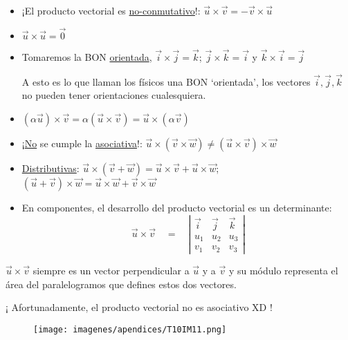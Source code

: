 \begin{itemize}
	\item ¡El producto vectorial es \underline{no-conmutativo}!: $\vec u \times \vec v=-\vec v \times \vec u$
	\item $\vec u \times \vec u=\vec 0$
	\item Tomaremos la BON \underline{orientada}, $\vec i \times \vec j = \vec k$; $\vec j \times \vec k = \vec i$ y $\vec k \times \vec i = \vec j$

A esto es lo que llaman los físicos una BON `orientada', los vectores $\vec i, \vec j, \vec k$ no pueden tener orientaciones cualesquiera. 	

\item $(\alpha \vec u)\times \vec v=\alpha (\vec u \times \vec v)= \vec u \times (\alpha \vec v)$
\item ¡\underline{No} se cumple la \underline{asociativa}!: $\vec u \times (\vec v \times \vec w) \neq (\vec u \times \vec v)\times \vec w$
\item \underline{Distributivas}: $\vec u \times (\vec v + \vec w)= \vec u \times \vec v + \vec u \times \vec w$; $(\vec u + \vec v)\times \vec w=\vec u \times \vec w + \vec v \times \vec w$
\item En componentes, el desarrollo del producto vectorial es un determinante:
\begin{equation}		
\boxed{ \ \overrightarrow { u } \times \overrightarrow { v } \quad =\quad \left| \begin{matrix} \overrightarrow { i }  & \overrightarrow { j }  & \overrightarrow { k }  \\ u_1 & u_2 & u_3 \\ v_1 & v_2 & v_3 \end{matrix} \right| \ }
\end{equation}
\end{itemize}
		
\vspace{2mm}$\vec u \times \vec v$ siempre es un vector perpendicular a $\vec u$ y a $\vec v$ y su módulo representa el área del paralelogramos que defines estos dos vectores.

\vspace{5mm} ¡ Afortunadamente, el producto vectorial no es asociativo XD !

\begin{figure}[H]
	\centering
	\texttt{[image: imagenes/apendices/T10IM11.png]}
\end{figure}

